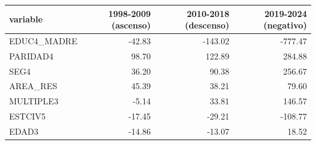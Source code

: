\begin{tabular}{lrrr}
\toprule
variable & 1998-2009 (ascenso) & 2010-2018 (descenso) & 2019-2024 (negativo) \\
\midrule
EDUC4\_MADRE & -42.83 & -143.02 & -777.47 \\
PARIDAD4 & 98.70 & 122.89 & 284.88 \\
SEG4 & 36.20 & 90.38 & 256.67 \\
AREA\_RES & 45.39 & 38.21 & 79.60 \\
MULTIPLE3 & -5.14 & 33.81 & 146.57 \\
ESTCIV5 & -17.45 & -29.21 & -108.77 \\
EDAD3 & -14.86 & -13.07 & 18.52 \\
\bottomrule
\end{tabular}

